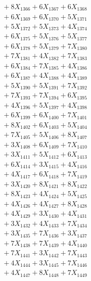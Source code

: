 \documentclass[a4paper,10pt]{article}
\begin{document}
{\begin{align}
&\;  + 8 X_{1366} + 6 X_{1367} + 6 X_{1368} \\[0.3ex]
&\;  + 6 X_{1369} + 6 X_{1370} + 5 X_{1371} \\[0.3ex]
&\;  + 5 X_{1372} + 5 X_{1373} + 4 X_{1374} \\[0.3ex]
&\;  + 6 X_{1375} + 5 X_{1376} + 5 X_{1377} \\[0.3ex]
&\;  + 6 X_{1378} + 5 X_{1379} + 7 X_{1380} \\[0.3ex]
&\;  + 7 X_{1381} + 4 X_{1382} + 7 X_{1383} \\[0.3ex]
&\;  + 6 X_{1384} + 7 X_{1385} + 4 X_{1386} \\[0.3ex]
&\;  + 6 X_{1387} + 4 X_{1388} + 4 X_{1389} \\[0.5ex]\allowbreak
&\;  + 5 X_{1390} + 5 X_{1391} + 7 X_{1392} \\[0.3ex]
&\;  + 7 X_{1393} + 7 X_{1394} + 6 X_{1395} \\[0.3ex]
&\;  + 4 X_{1396} + 5 X_{1397} + 4 X_{1398} \\[0.3ex]
&\;  + 6 X_{1399} + 6 X_{1400} + 7 X_{1401} \\[0.3ex]
&\;  + 8 X_{1402} + 6 X_{1403} + 5 X_{1404} \\[0.3ex]
&\;  + 7 X_{1405} + 5 X_{1406} + 8 X_{1407} \\[0.3ex]
&\;  + 3 X_{1408} + 6 X_{1409} + 7 X_{1410} \\[0.3ex]
&\;  + 3 X_{1411} + 5 X_{1412} + 6 X_{1413} \\[0.3ex]
&\;  + 6 X_{1414} + 3 X_{1415} + 4 X_{1416} \\[0.3ex]
&\;  + 4 X_{1417} + 6 X_{1418} + 7 X_{1419} \\[0.5ex]\allowbreak
&\;  + 3 X_{1420} + 8 X_{1421} + 8 X_{1422} \\[0.3ex]
&\;  + 8 X_{1423} + 4 X_{1424} + 5 X_{1425} \\[0.3ex]
&\;  + 4 X_{1426} + 4 X_{1427} + 8 X_{1428} \\[0.3ex]
&\;  + 4 X_{1429} + 3 X_{1430} + 4 X_{1431} \\[0.3ex]
&\;  + 3 X_{1432} + 4 X_{1433} + 7 X_{1434} \\[0.3ex]
&\;  + 3 X_{1435} + 7 X_{1436} + 3 X_{1437} \\[0.3ex]
&\;  + 7 X_{1438} + 7 X_{1439} + 4 X_{1440} \\[0.3ex]
&\;  + 7 X_{1441} + 3 X_{1442} + 7 X_{1443} \\[0.3ex]
&\;  + 4 X_{1444} + 3 X_{1445} + 7 X_{1446} \\[0.3ex]
&\;  + 4 X_{1447} + 8 X_{1448} + 7 X_{1449} \\[0.5ex]\allowbreak

\end{align}}
\end{document}
